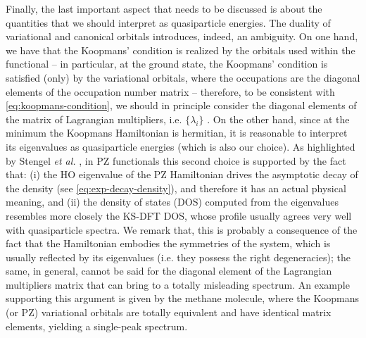 Finally, the last important aspect that needs to be discussed is about the quantities that we should interpret as quasiparticle energies. The duality of variational and canonical orbitals introduces, indeed, an ambiguity. On one hand, we have that the Koopmans' condition is realized by the orbitals used within the functional -- in particular, at the ground state, the Koopmans' condition is satisfied (only) by the variational orbitals, where the occupations are the diagonal elements of the occupation number matrix -- therefore, to be consistent with \cref{eq:koopmans-condition}, we should in principle consider the diagonal elements of the matrix of Lagrangian multipliers, i.e. $\{ \lambda_i \}$ \cite{vydrov_tests_2007}. On the other hand, since at the minimum the Koopmans Hamiltonian is hermitian, it is reasonable to interpret its eigenvalues as quasiparticle energies (which is also our choice). As highlighted by Stengel \emph{et al.} \cite{stengel_self-interaction_2008}, in PZ functionals this second choice is supported by the fact that: (i) the HO eigenvalue of the PZ Hamiltonian drives the asymptotic decay of the density (see \cref{eq:exp-decay-density}), and therefore it has an actual physical meaning, and (ii) the density of states (DOS) computed from the eigenvalues resembles more closely the KS-DFT DOS, whose profile usually agrees very well with quasiparticle spectra. We remark that, this is probably a consequence of the fact that the Hamiltonian embodies the symmetries of the system, which is usually reflected by its eigenvalues (i.e. they possess the right degeneracies); the same, in general, cannot be said for the diagonal element of the Lagrangian multipliers matrix that can bring to a totally misleading spectrum. An example supporting this argument is given by the methane molecule, where the Koopmans (or PZ) variational orbitals are totally equivalent and have identical matrix elements, yielding a single-peak spectrum.

